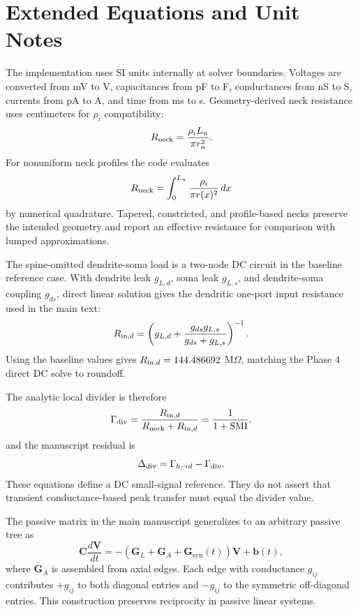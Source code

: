 \section{Extended Equations and Unit Notes}

The implementation uses SI units internally at solver boundaries. Voltages are converted from mV to V, capacitances from pF to F, conductances from nS to S, currents from pA to A, and time from ms to s. Geometry-derived neck resistance uses centimeters for $\rho_i$ compatibility:
\begin{equation}
R_{\mathrm{neck}}=\frac{\rho_i L_n}{\pi r_n^2}.
\end{equation}
For nonuniform neck profiles the code evaluates
\begin{equation}
R_{\mathrm{neck}}=\int_0^{L_n}\frac{\rho_i}{\pi r(x)^2}\,dx
\end{equation}
by numerical quadrature. Tapered, constricted, and profile-based necks preserve the intended geometry and report an effective resistance for comparison with lumped approximations.

The spine-omitted dendrite-soma load is a two-node DC circuit in the baseline reference case. With dendrite leak $g_{L,d}$, soma leak $g_{L,s}$, and dendrite-soma coupling $g_{ds}$, direct linear solution gives the dendritic one-port input resistance used in the main text:
\begin{equation}
R_{\mathrm{in},d} =
\left(g_{L,d}+\frac{g_{ds}g_{L,s}}{g_{ds}+g_{L,s}}\right)^{-1}.
\end{equation}
Using the baseline values gives $R_{\mathrm{in},d}=144.486692$ M$\Omega$, matching the Phase 4 direct DC solve to roundoff.

The analytic local divider is therefore
\begin{equation}
\Gamma_{\mathrm{div}}=\frac{R_{\mathrm{in},d}}{R_{\mathrm{neck}}+R_{\mathrm{in},d}}=\frac{1}{1+\mathrm{SMI}},
\end{equation}
and the manuscript residual is
\begin{equation}
\Delta_{\mathrm{div}}=\Gamma_{h\rightarrow d}-\Gamma_{\mathrm{div}}.
\end{equation}
These equations define a DC small-signal reference. They do not assert that transient conductance-based peak transfer must equal the divider value.

The passive matrix in the main manuscript generalizes to an arbitrary passive tree as
\begin{equation}
\mathbf{C}\frac{d\mathbf{V}}{dt}=-\left(\mathbf{G}_L+\mathbf{G}_A+\mathbf{G}_{\mathrm{syn}}(t)\right)\mathbf{V}+\mathbf{b}(t),
\end{equation}
where $\mathbf{G}_A$ is assembled from axial edges. Each edge with conductance $g_{ij}$ contributes $+g_{ij}$ to both diagonal entries and $-g_{ij}$ to the symmetric off-diagonal entries. This construction preserves reciprocity in passive linear systems.

